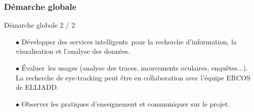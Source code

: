 \documentclass[xcolor=dvipsnames]{beamer}
\begin{document}
\begin{frame}[fragile]
\frametitle{Démarche globale}
\begin{block}{Démarche globale 2 / 2}
	\begin{itemize}
		\item[$\bullet$]Développer des services intelligents pour la recherche d'information, la visualisation et l'analyse des données.
		\item[$\bullet$]Évaluer les usages (analyse des traces, mouvements oculaires, enquêtes...). La recherche de eye-tracking peut être en collaboration avec l'équipe ERCOS de ELLIADD.
		\item[$\bullet$]Observer les pratiques d'enseignement et communiquer sur le projet.
	\end{itemize}
\end{block}
\vspace{2cm}
\end{frame}
\end{document}
